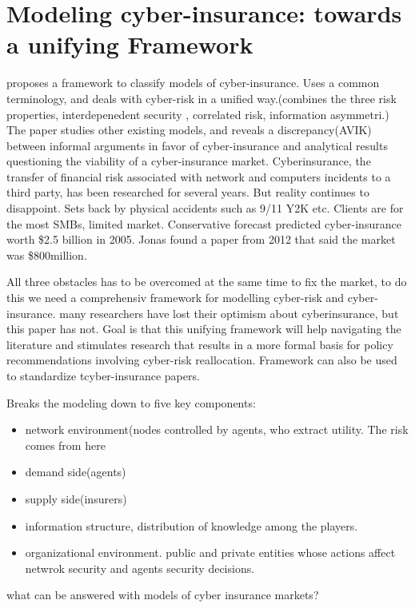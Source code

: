 \section{Modeling cyber-insurance: towards a unifying Framework}
proposes a framework to classify models of cyber-insurance. Uses a common terminology, 
and deals with cyber-risk in a unified way.(combines the three risk properties, interdepenedent security
, correlated risk, information asymmetri.)
The paper studies other existing models, and reveals a discrepancy(AVIK) between informal arguments in 
favor of cyber-insurance and analytical results questioning the viability of a cyber-insurance market.
Cyberinsurance, the transfer of financial risk associated with network and computers 
incidents to a third party, has been researched for several years. But reality continues to disappoint. 
Sets back by physical accidents such as 9/11 Y2K etc. Clients are for the most SMBs, limited market. 
Conservative forecast predicted cyber-insurance worth \$2.5 billion in 2005. Jonas found a paper from 2012 that said the market was \$800million.

All three obstacles has to be overcomed at the same time to fix the market,
 to do this we need a comprehensiv framework for modelling cyber-risk and cyber-insurance.
many researchers have lost their optimism about cyberinsurance, but this paper has not.
Goal is that this unifying framework will help navigating the literature and stimulates research that results in a more
formal basis for policy recommendations involving cyber-risk reallocation. Framework can also be used to standardize tcyber-insurance papers.

Breaks the modeling down to five key components: 
\begin{itemize}[topsep=-1em,parsep=0em,itemsep=0em] 
 \item network environment(nodes controlled by agents, who extract utility. 
 The risk comes from here \item demand side(agents) \item supply side(insurers) 
 \item information structure, distribution of knowledge among the players. 
 \item organizational environment. 
 public and private entities whose actions affect netwrok security and agents security decisions.
 
\end{itemize}

what can be answered with models of cyber insurance markets?

